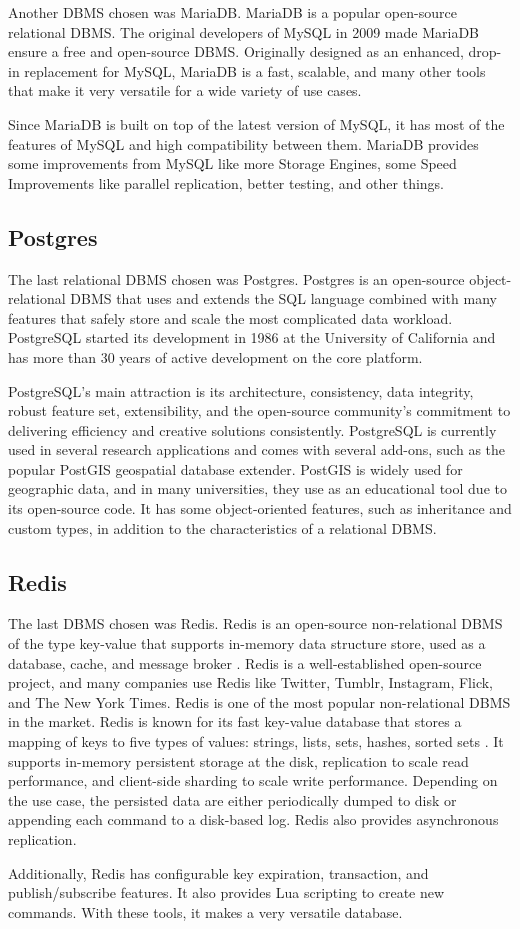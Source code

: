 Another DBMS chosen was MariaDB. MariaDB is a popular open-source relational DBMS. The original developers of MySQL in 2009 made MariaDB ensure a free and open-source DBMS. Originally designed as an enhanced, drop-in replacement for MySQL, MariaDB is a fast, scalable, and many other tools that make it very versatile for a wide variety of use cases.

Since MariaDB is built on top of the latest version of MySQL, it has most of the features of MySQL and high compatibility between them. MariaDB provides some improvements from MySQL like more Storage Engines, some Speed Improvements like parallel replication, better testing, and other things.

\subsection{Postgres}

The last relational DBMS chosen was Postgres. Postgres is an open-source object-relational DBMS that uses and extends the SQL language combined with many features that safely store and scale the most complicated data workload. PostgreSQL started its development in 1986 at the University of California and has more than 30 years of active development on the core platform.

PostgreSQL's main attraction is its architecture, consistency, data integrity, robust feature set, extensibility, and the open-source community's commitment to delivering efficiency and creative solutions consistently. PostgreSQL is currently used in several research applications and comes with several add-ons, such as the popular PostGIS geospatial database extender. PostGIS is widely used for geographic data, and in many universities, they use as an educational tool due to its open-source code. It has some object-oriented features, such as inheritance and custom types, in addition to the characteristics of a relational DBMS.


\subsection{Redis}

The last DBMS chosen was Redis. Redis is an open-source non-relational DBMS of the type key-value that supports in-memory data structure store, used as a database, cache, and message broker \cite{da2015redis}.
Redis is a well-established open-source project, and many companies use Redis like Twitter, Tumblr, Instagram, Flick, and The New York Times. Redis is one of the most popular non-relational DBMS in the market\cite{da2015redis}.
Redis is known for its fast key-value database that stores a mapping of keys to five types of values: strings, lists, sets, hashes, sorted sets \cite{10.55552505464,redis}. It supports in-memory persistent storage at the disk, replication to scale read performance, and client-side sharding to scale write performance. Depending on the use case, the persisted data are either periodically dumped to disk or appending each command to a disk-based log. Redis also provides asynchronous replication\cite{10.55552505464,redis}. 

Additionally, Redis has configurable key expiration, transaction, and publish/subscribe features. It also provides Lua scripting to create new commands. With these tools, it makes a very versatile database\cite{da2015redis,redis}.